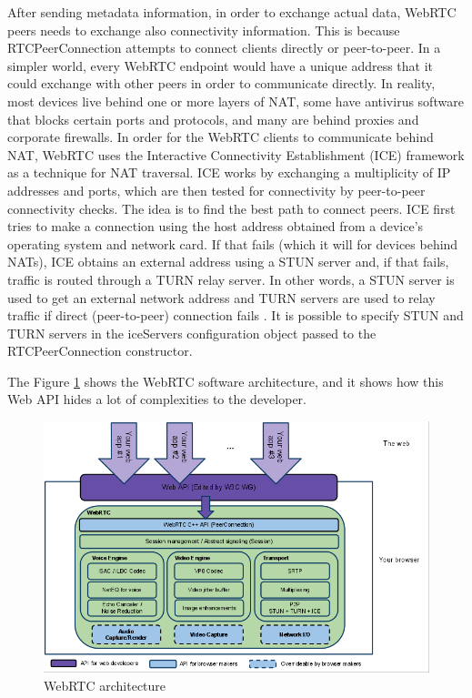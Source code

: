 \documentclass[../main.tex]{subfiles}
\begin{document}
After sending metadata information, in order to exchange actual data, WebRTC peers needs to exchange also connectivity information. This is because RTCPeerConnection attempts to connect clients directly or peer-to-peer. In a simpler world, every WebRTC endpoint would have a unique address that it could exchange with other peers in order to communicate directly. In reality, most devices live behind one or more layers of NAT, some have antivirus software that blocks certain ports and protocols, and many are behind proxies and corporate firewalls. In order for the WebRTC clients to communicate behind NAT, WebRTC uses the Interactive Connectivity Establishment (ICE) framework as a technique for NAT traversal. ICE works by exchanging a multiplicity of IP addresses and ports, which are then tested for connectivity by peer-to-peer connectivity checks. The idea is to find the best path to connect peers. ICE first tries to make a connection using the host address obtained from a device's operating system and network card. If that fails (which it will for devices behind NATs), ICE obtains an external address using a STUN server and, if that fails, traffic is routed through a TURN relay server. In other words, a STUN server is used to get an external network address and TURN servers are used to relay traffic if direct (peer-to-peer) connection fails \cite{STUN_TURN}. It is possible to specify STUN and TURN servers in the iceServers configuration object passed to the RTCPeerConnection constructor. 

The Figure \ref{fig:webrtc architecture} shows the WebRTC software architecture, and it shows how this Web API hides a lot of complexities to the developer. 

\begin{figure}[ht]
    \centering
    \includegraphics[width=\textwidth]{images/WebRTC architecture.png}
    \caption{WebRTC architecture \cite{WebRTC_architecture}}
    \label{fig:webrtc architecture}
\end{figure}
\end{document}
